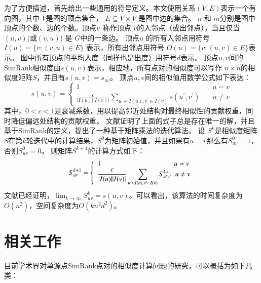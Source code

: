 \documentclass[master]{njuthesis}
\begin{document}
为了方便描述，首先给出一些通用的符号定义。本文使用关系$(V, E)$表示一个有向图，其中 $V$是图的顶点集合，
$E \subseteq V \times V$ 是图中边的集合。
$n$ 和 $m$分别是图中顶点的个数、边的个数。顶点$u$ 称作顶点 $v$的入邻点（或出邻点），当且仅当$(u, v)$(或$(v,u)$) 是 $G$中的一条边。
顶点$u$ 的所有入邻点用符号 $I(u)=\{v: (v, u) \in E\}$ 表示，所有出邻点用符号 $O(u)=\{v: (u, v) \in E\}$表示。
图中所有顶点的平均入度（同样也是出度）用符号$d$表示。
顶点$u, v$间的SimRank相似度由$s(u, v)$表示，相应地，所有点对的相似度可以写作 $n\times n$的相似度矩阵$S$，并且有$s(u, v)=s_{uv}$。
顶点$u, v$间的相似值用数学公式如下表达：
\begin{equation}
s(u, v) = \left\{
        \begin{array}{ll}
	1 & \quad u = v  \\
	\displaystyle\frac{c}{|I(u)||I(v)|}\displaystyle\sum_{u^\prime \in I(u), v^\prime \in I(v)} s(u^\prime, v^\prime) & \quad u \ne v
        \end{array}
    \right.
	\label{eq:one}
\end{equation}
其中，$0 < c < 1$是衰减系数，用以提高邻近处结构对最终相似性的贡献权重，同时降低偏远处结构的贡献权重。
文献\cite{jeh2002simrank}证明了上面的式子总是存在唯一的解，并且基于SimRank的定义，提出了一种基于矩阵乘法的迭代算法。
设 $S^k$是相似度矩阵$S$在第$k$轮迭代中的计算结果，$S^0$为矩阵初始值，并且如果有$u = v$那么有$S^0_{uv} = 1$，否则$S^0_{uv} = 0$。
则矩阵$S^{k+1}$的计算方式如下：
\begin{equation}
S^{k+1}_{uv} = \left\{
        \begin{array}{ll}
	1 &\hspace{-0.5em}  \! u = v  \\
	\displaystyle\frac{c}{|I(u)||I(v)|}\displaystyle\sum_{u^\prime \in I(u), v^\prime \in I(v)} S^{k+1}_{u^\prime v^\prime}  & \hspace{-0.5em} u \ne v
        \end{array}
    \right.
	\label{eq:two}
\end{equation}
文献\cite{jeh2002simrank}已经证明，$\lim_{k\to\infty}S^k_{uv} = s(u,v)$。可以看出，该算法的时间复杂度为$O(n^2)$，空间复杂度为$O(kn^2d^2)$。

\section{相关工作}
目前学术界对单源点SimRank点对的相似度计算问题的研究，可以概括为如下几类：
\end{document}
